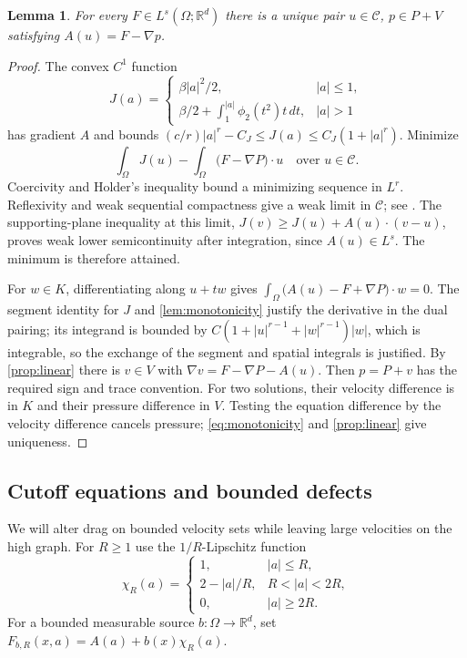 \documentclass[11pt]{article}
\newtheorem{lemma}[lemma]{Lemma}
\theoremstyle{remark}
\newcommand{\R}{\mathbb R}
\newcommand{\pair}[2]{\int_\Omega \big(#1\big)\cdot #2}
\begin{document}
\begin{lemma}\label{lem:auxiliary}
For every $F\in L^s(\Omega;\R^d)$ there is a unique pair
$u\in\mathcal C$, $p\in P+V$ satisfying $A(u)=F-\nabla p$.
\end{lemma}
\begin{proof}
The convex $C^1$ function
\[
 J(a)=\begin{cases}
 \beta|a|^2/2,&|a|\le1,\\
 \beta/2+\displaystyle\int_1^{|a|}\phi_2(t^2)t\,dt,&|a|>1
 \end{cases}
\]
has gradient $A$ and bounds
$(c/r)|a|^r-C_J\le J(a)\le C_J(1+|a|^r)$.
Minimize
\[
 \int_\Omega J(u)-\pair{F-\nabla P}{u}
 \quad\text{over }u\in\mathcal C.
\]
Coercivity and Holder's inequality bound a minimizing sequence in $L^r$.
Reflexivity and weak sequential compactness give a weak limit in
$\mathcal C$; see \cite[Theorems 3.18 and 4.10]{Brezis}.
The supporting-plane inequality at this limit,
$J(v)\ge J(u)+A(u)\cdot(v-u)$, proves weak lower semicontinuity after
integration, since $A(u)\in L^s$. The minimum is therefore attained.

For $w\in K$, differentiating along $u+tw$ gives
$\pair{A(u)-F+\nabla P}{w}=0$. The segment identity for $J$ and
\cref{lem:monotonicity} justify the derivative in the dual pairing;
its integrand is bounded by
$C(1+|u|^{r-1}+|w|^{r-1})|w|$, which is integrable, so the exchange
of the segment and spatial integrals is justified. By \cref{prop:linear}
there is $v\in V$ with $\nabla v=F-\nabla P-A(u)$.
Then $p=P+v$ has the required sign and trace convention.
For two solutions, their velocity difference is in $K$ and their
pressure difference in $V$. Testing the equation difference by the
velocity difference cancels pressure; \eqref{eq:monotonicity} and
\cref{prop:linear} give uniqueness.
\end{proof}

\subsection{Cutoff equations and bounded defects}
We will alter drag on bounded velocity sets while leaving large velocities
on the high graph. For $R\ge1$ use the $1/R$-Lipschitz function
\begin{equation}\label{eq:cutoff}
 \chi_R(a)=\begin{cases}
 1,&|a|\le R,\\2-|a|/R,&R<|a|<2R,\\0,&|a|\ge2R.
 \end{cases}
\end{equation}
For a bounded measurable source $b:\Omega\to\R^d$, set
$F_{b,R}(x,a)=A(a)+b(x)\chi_R(a)$.
\end{document}
